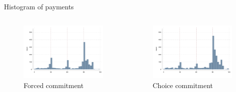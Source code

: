 \documentclass[8pt]{beamer}
\begin{document}
\begin{frame}{Histogram of payments}
\begin{columns}
\begin{column}{.33\textwidth}
    \begin{figure}[H]
    \caption{Forced commitment}
    \begin{center}
        \includegraphics[width=\textwidth]{Figuras/hist_payments_fc.pdf}
    \end{center}
\end{figure}
\end{column}

\begin{column}{.33\textwidth}
    \begin{figure}[H]
    \caption{Choice commitment}
    \begin{center}
        \includegraphics[width=\textwidth]{Figuras/hist_payments_cc.pdf}
    \end{center}
\end{figure}
\end{column}
\end{columns}

\end{frame}
\end{document}
